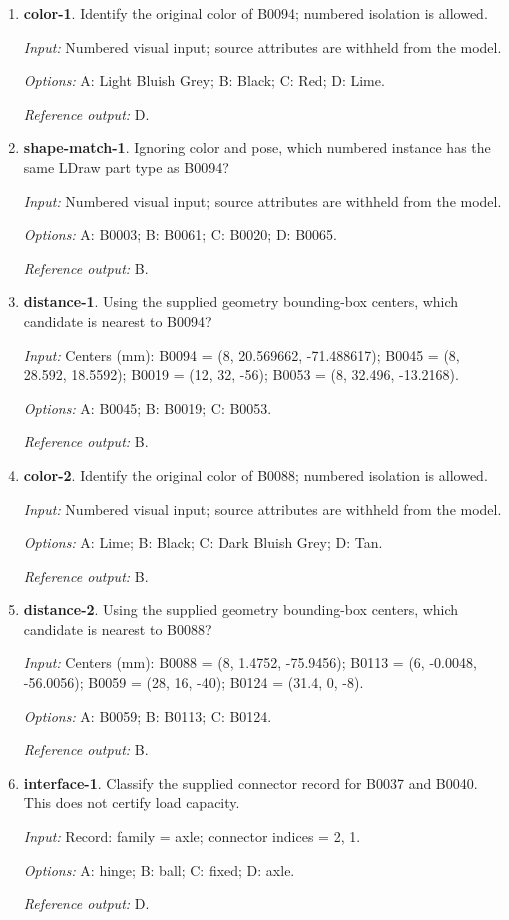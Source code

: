 \begin{enumerate}
\item \textbf{color-1}. Identify the original color of B0094; numbered isolation is allowed.\par {\small \textit{Input:} Numbered visual input; source attributes are withheld from the model. \par\textit{Options:} A: Light Bluish Grey; B: Black; C: Red; D: Lime. \par\textit{Reference output:} D.}
\item \textbf{shape-match-1}. Ignoring color and pose, which numbered instance has the same LDraw part type as B0094?\par {\small \textit{Input:} Numbered visual input; source attributes are withheld from the model. \par\textit{Options:} A: B0003; B: B0061; C: B0020; D: B0065. \par\textit{Reference output:} B.}
\item \textbf{distance-1}. Using the supplied geometry bounding-box centers, which candidate is nearest to B0094?\par {\small \textit{Input:} Centers (mm): B0094 = (8, 20.569662, -71.488617); B0045 = (8, 28.592, 18.5592); B0019 = (12, 32, -56); B0053 = (8, 32.496, -13.2168). \par\textit{Options:} A: B0045; B: B0019; C: B0053. \par\textit{Reference output:} B.}
\item \textbf{color-2}. Identify the original color of B0088; numbered isolation is allowed.\par {\small \textit{Input:} Numbered visual input; source attributes are withheld from the model. \par\textit{Options:} A: Lime; B: Black; C: Dark Bluish Grey; D: Tan. \par\textit{Reference output:} B.}
\item \textbf{distance-2}. Using the supplied geometry bounding-box centers, which candidate is nearest to B0088?\par {\small \textit{Input:} Centers (mm): B0088 = (8, 1.4752, -75.9456); B0113 = (6, -0.0048, -56.0056); B0059 = (28, 16, -40); B0124 = (31.4, 0, -8). \par\textit{Options:} A: B0059; B: B0113; C: B0124. \par\textit{Reference output:} B.}
\item \textbf{interface-1}. Classify the supplied connector record for B0037 and B0040. This does not certify load capacity.\par {\small \textit{Input:} Record: family = axle; connector indices = 2, 1. \par\textit{Options:} A: hinge; B: ball; C: fixed; D: axle. \par\textit{Reference output:} D.}

\end{enumerate}
